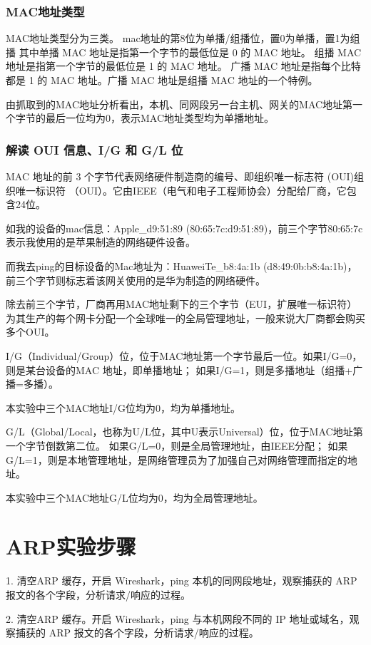 \documentclass[a4paper,12pt]{report}
\begin{document}
\begin{spacing}{1.5}
\subsubsection{MAC地址类型}
MAC地址类型分为三类。
mac地址的第8位为单播/组播位，置0为单播，置1为组播
其中单播 MAC 地址是指第⼀个字节的最低位是 0 的 MAC 地址。
组播 MAC 地址是指第⼀个字节的最低位是 1 的 MAC 地址。
⼴播 MAC 地址是指每个⽐特都是 1 的 MAC 地址。⼴播 MAC 地址是组播 MAC 地址的⼀个特例。

由抓取到的MAC地址分析看出，本机、同⽹段另⼀台主机、⽹关的MAC地址第一个字节的最后⼀位均为0，表⽰MAC地址类型均为单播地址。

\subsubsection{解读 OUI 信息、I/G 和 G/L 位}
MAC 地址的前 3 个字节代表⽹络硬件制造商的编号、即组织唯⼀标志符 (OUI)组织唯⼀标识符 （OUI）。它由IEEE（电⽓和电⼦⼯程师协会）分配给⼚商，它包含24位。

如我的设备的mac信息：Apple\_d9:51:89 (80:65:7c:d9:51:89)，前三个字节80:65:7c表示我使用的是苹果制造的网络硬件设备。

而我去ping的目标设备的Mac地址为：HuaweiTe\_b8:4a:1b (d8:49:0b:b8:4a:1b)，前三个字节则标志着该网关使用的是华为制造的⽹络硬件。

除去前三个字节，⼚商再⽤MAC地址剩下的三个字节（EUI，扩展唯⼀标识符）为其⽣产的每个⽹卡分配⼀个全球唯⼀的全局管理地址，⼀般来说⼤⼚商都会购买多个OUI。

I/G（Individual/Group）位，位于MAC地址第⼀个字节最后⼀位。如果I/G=0，则是某台设备的MAC 地址，即单播地址；
如果I/G=1，则是多播地址（组播+⼴播=多播）。

本实验中三个MAC地址I/G位均为0，均为单播地址。

G/L（Global/Local，也称为U/L位，其中U表⽰Universal）位，位于MAC地址第⼀个字节倒数第⼆位。
如果G/L=0，则是全局管理地址，由IEEE分配；
如果G/L=1，则是本地管理地址，是⽹络管理员为了加强⾃⼰对⽹络管理⽽指定的地址。

本实验中三个MAC地址G/L位均为0，均为全局管理地址。

\section{ARP实验步骤}
1. 清空ARP 缓存，开启 Wireshark，ping 本机的同网段地址，观察捕获的 ARP 报文的各个字段，分析请求/响应的过程。

2. 清空ARP 缓存。开启 Wireshark，ping 与本机网段不同的 IP 地址或域名，观察捕获的 ARP 报文的各个字段，分析请求/响应的过程。


\end{spacing}
\end{document}
